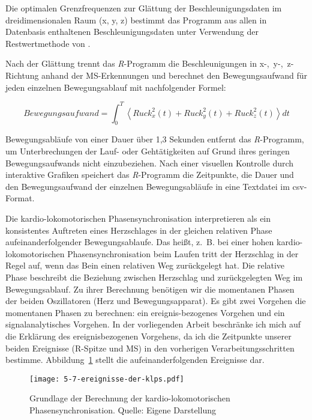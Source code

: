Die optimalen Grenzfrequenzen zur Glättung der Beschleunigungsdaten im dreidimensionalen Raum (x, y, z) bestimmt das Programm aus allen in Datenbasis enthaltenen Beschleunigungsdaten unter Verwendung der Restwertmethode von \citet{Wells1980}.

Nach der Glättung trennt das \emph{R}-Programm die Beschleunigungen in \mbox{x-, y-, z-Richtung} anhand der \ac{MS}-Erkennungen und berechnet den Bewegungsaufwand für jeden einzelnen Bewegungsablauf mit nachfolgender Formel:

\begin{equation}
	Bewegungsaufwand = \int^T_0 \left\langle {Ruck^2_{x}(t) + Ruck^2_{y}(t) + Ruck^2_{z}(t)}\right\rangle dt
\end{equation}

Bewegungsabläufe von einer Dauer über 1,3 Sekunden entfernt das \emph{R}-Programm, um Unterbrechungen der Lauf- oder Gehtätigkeiten auf Grund ihres geringen Bewegungsaufwands nicht einzubeziehen. Nach einer visuellen Kontrolle durch interaktive Grafiken speichert das \emph{R}-Programm die Zeitpunkte, die Dauer und den Bewegungsaufwand der einzelnen Bewegungsabläufe in eine Textdatei im \acs{csv}-Format.

Die kardio-lokomotorischen Phasensynchronisation interpretieren \citet[][S.~12]{Niizeki2014} als ein konsistentes Auftreten eines Herzschlages in der gleichen relativen Phase aufeinanderfolgender Bewegungsablaufe. Das heißt, z.~B. bei einer hohen kardio-lokomotorischen Phasensynchronisation beim Laufen tritt der Herzschlag in der Regel auf, wenn das Bein einen relativen Weg zurückgelegt hat. Die relative Phase beschreibt die Beziehung zwischen Herzschlag und zurückgelegten Weg im Bewegungsablauf. Zu ihrer Berechnung benötigen wir die momentanen Phasen der beiden Oszillatoren (Herz und Bewegungsapparat). Es gibt zwei Vorgehen die momentanen Phasen zu berechnen: ein ereignis-bezogenes Vorgehen und ein signalanalytisches Vorgehen. In der vorliegenden Arbeit beschränke ich mich auf die Erklärung des ereignisbezogenen Vorgehens, da ich die Zeitpunkte unserer beiden Ereignisse (R-Spitze und \ac{MS}) in den vorherigen Verarbeitungsschritten bestimme. Abbildung~\ref{fig:5-7-ereignisse-der-klps} stellt die aufeinanderfolgenden Ereignisse dar.

\begin{figure}[t]
	\centering
		\texttt{[image: 5-7-ereignisse-der-klps.pdf]}
	\caption[Grundlage der Berechnung der kardio-lokomotorischen Phasensynchronisation]{Grundlage der Berechnung der kardio-lokomotorischen Phasensynchronisation. Quelle: Eigene Darstellung}
	\label{fig:5-7-ereignisse-der-klps}
\end{figure}

